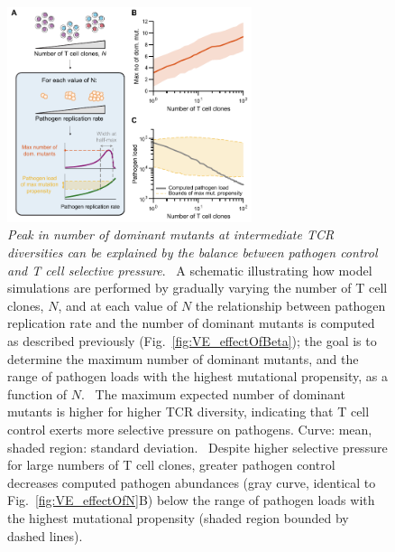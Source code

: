 \begin{figure}[t!]
    \centering
    \includegraphics[width=0.64\textwidth]{Figures/VE/fig6_maxMutProp.pdf}
    \caption[Peak in number of dominant mutants at intermediate TCR diversities can be explained by the balance between pathogen control and T cell selective pressure]{\textit{Peak in number of dominant mutants at intermediate TCR diversities can be explained by the balance between pathogen control and T cell selective pressure}. %
    ~A schematic illustrating how model simulations are performed by gradually varying the number of T cell clones, $N$, and at each value of $N$ the relationship between pathogen replication rate and the number of dominant mutants is computed as described previously (Fig.~\ref{fig:VE_effectOfBeta}); the goal is to determine the maximum number of dominant mutants, and the range of pathogen loads with the highest mutational propensity, as a function of $N$. %
    ~The maximum expected number of dominant mutants is higher for higher TCR diversity, indicating that T cell control exerts more selective pressure on pathogens. Curve: mean, shaded region: standard deviation. %
    ~Despite higher selective pressure for large numbers of T cell clones, greater pathogen control decreases computed pathogen abundances (gray curve, identical to Fig.~\ref{fig:VE_effectOfN}B) below the range of pathogen loads with the highest mutational propensity (shaded region bounded by dashed lines).} 
    \label{fig:VE_supp_maxMutProp}
\end{figure}

